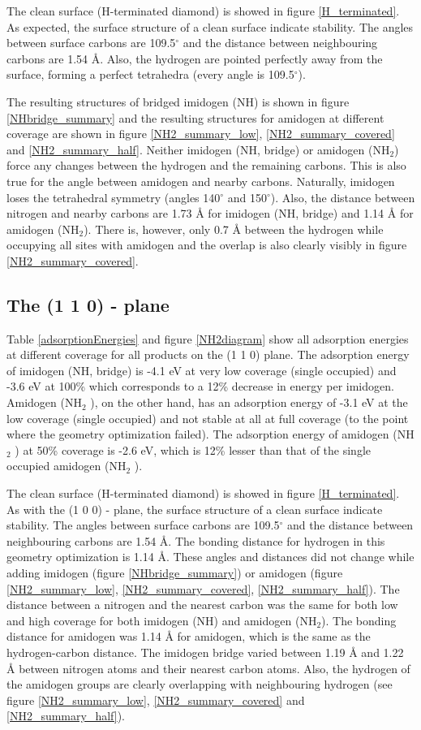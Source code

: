 \documentclass[12pt,a4paper]{article}
\begin{document}
The clean surface (H-terminated diamond) is showed in figure \ref{H_terminated}. As expected, the surface structure of a clean surface indicate stability. The angles between surface carbons are 109.5$^{\circ}$ and the distance between neighbouring carbons are 1.54 Å. Also, the hydrogen are pointed perfectly away from the surface, forming a perfect tetrahedra (every angle is 109.5$^{\circ}$).

The resulting structures of bridged imidogen (NH) is shown in figure \ref{NHbridge_summary} and the resulting structures for amidogen at different coverage are shown in figure \ref{NH2_summary_low}, \ref{NH2_summary_covered} and \ref{NH2_summary_half}.  Neither imidogen (NH, bridge) or amidogen (NH$_2$) force any changes between the hydrogen and the remaining carbons. This is also true for the angle between amidogen and nearby carbons. Naturally, imidogen loses the tetrahedral symmetry (angles 140$^{\circ}$ and 150$^{\circ}$). Also, the distance between nitrogen and nearby carbons are 1.73 Å for imidogen (NH, bridge) and 1.14 Å for amidogen (NH$_2$). There is, however, only 0.7 Å between the hydrogen while occupying all sites with amidogen and the overlap is also clearly visibly in figure \ref{NH2_summary_covered}.

\subsection{The (1 1 0) - plane}
Table \ref{adsorptionEnergies} and figure \ref{NH2diagram} show all adsorption energies at different coverage for all products on the (1 1 0) plane. The adsorption energy of imidogen (NH, bridge) is -4.1 eV at very low coverage (single occupied) and -3.6 eV at 100\% which corresponds to a 12\% decrease in energy per imidogen. Amidogen (NH$_2$ ), on the other hand, has an adsorption energy of -3.1 eV at the low coverage (single occupied) and not stable at all at full coverage (to the point where the geometry optimization failed). The adsorption energy of amidogen (NH$_2$ ) at 50\% coverage is -2.6 eV, which is 12\% lesser than that of the single occupied amidogen (NH$_2$ ). 


The clean surface (H-terminated diamond) is showed in figure \ref{H_terminated}. As with the (1 0 0) - plane, the surface structure of a clean surface indicate stability. The angles between surface carbons are 109.5$^{\circ}$ and the distance between neighbouring carbons are 1.54 Å. The bonding distance for hydrogen in this geometry optimization is 1.14 Å. These angles and distances did not change while adding imidogen (figure \ref{NHbridge_summary}) or amidogen (figure \ref{NH2_summary_low},   \ref{NH2_summary_covered}, \ref{NH2_summary_half}). The distance between a nitrogen and the nearest carbon was the same for both low and high coverage for both imidogen (NH) and amidogen (NH$_2$). The bonding distance for amidogen was 1.14 Å for amidogen, which is the same as the hydrogen-carbon distance. The imidogen bridge varied between 1.19 Å and 1.22 Å between nitrogen atoms and their nearest carbon atoms. Also, the hydrogen of the amidogen groups are clearly overlapping with neighbouring hydrogen (see figure \ref{NH2_summary_low}, \ref{NH2_summary_covered} and \ref{NH2_summary_half}).
\end{document}
